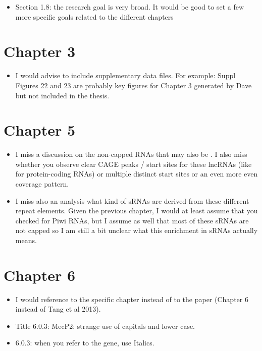 \documentclass[10pt,a4paper,sans]{article}
\begin{document}
\begin{itemize}
   \item{Section 1.8: the research goal is very broad. It would be good to set a few more specific goals related to the different chapters}
\end{itemize}

\section{Chapter 3}

\begin{itemize}
   \item{I would advise to include supplementary data files. For example: Suppl Figures 22 and 23 are probably key figures for Chapter 3 generated by Dave but not included in the thesis.}
\end{itemize}

\section{Chapter 5}

\begin{itemize}
   \item{I miss a discussion on the non-capped RNAs that may also be . I also miss whether you observe clear CAGE peaks / start sites for these lncRNAs (like for protein-coding RNAs) or multiple distinct start sites or an even more even coverage pattern.}
\end{itemize}

\begin{itemize}
   \item{I miss also an analysis what kind of sRNAs are derived from these different repeat elements. Given the previous chapter, I would at least assume that you checked for Piwi RNAs, but I assume as well that most of these sRNAs are not capped so I am still a bit unclear what this enrichment in sRNAs actually means.}
\end{itemize}

\section{Chapter 6}

\begin{itemize}
   \item{I would reference to the specific chapter instead of to the paper (Chapter 6 instead of Tang et al 2013).}
\end{itemize}

\begin{itemize}
   \item{Title 6.0.3: MecP2: strange use of capitals and lower case.}
\end{itemize}

\begin{itemize}
   \item{6.0.3: when you refer to the gene, use Italics.}
\end{itemize}
\end{document}
